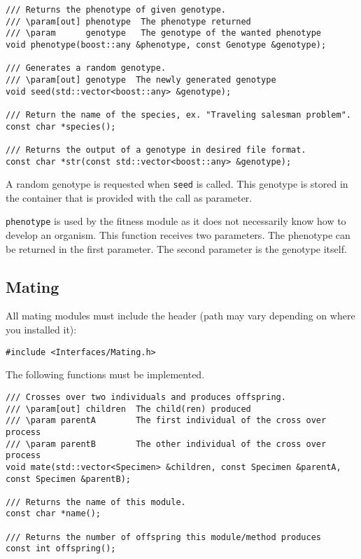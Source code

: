 \begin{verbatim}
/// Returns the phenotype of given genotype.
/// \param[out]	phenotype  The phenotype returned
/// \param		genotype   The genotype of the wanted phenotype
void phenotype(boost::any &phenotype, const Genotype &genotype);

/// Generates a random genotype.
/// \param[out] genotype  The newly generated genotype
void seed(std::vector<boost::any> &genotype);

/// Return the name of the species, ex. "Traveling salesman problem".
const char *species();

/// Returns the output of a genotype in desired file format.
const char *str(const std::vector<boost::any> &genotype);
\end{verbatim}

\noindent A random genotype is requested when \texttt{seed} is called. This genotype is stored in the container that is provided with the call as parameter.

\texttt{phenotype} is used by the fitness module as it does not necessarily know how to develop an organism. This function receives two parameters. The phenotype can be returned in the first parameter. The second parameter is the genotype itself.


\subsection{Mating}

All mating modules must include the header (path may vary depending on where you installed it):

\begin{verbatim}
#include <Interfaces/Mating.h>
\end{verbatim}

\noindent The following functions must be implemented.

\begin{verbatim}
/// Crosses over two individuals and produces offspring.
/// \param[out] children  The child(ren) produced
/// \param parentA        The first individual of the cross over process
/// \param parentB        The other individual of the cross over process
void mate(std::vector<Specimen> &children, const Specimen &parentA, const Specimen &parentB);

/// Returns the name of this module.
const char *name();

/// Returns the number of offspring this module/method produces
const int offspring();
\end{verbatim}

